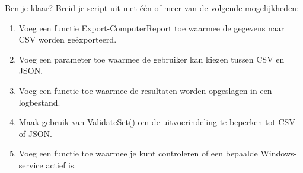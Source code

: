 Ben je klaar? Breid je script uit met één of meer van de volgende mogelijkheden:
\begin{enumerate}
\item Voeg een functie Export-ComputerReport toe waarmee de gegevens naar CSV worden geëxporteerd.
\item Voeg een parameter toe waarmee de gebruiker kan kiezen tussen CSV en JSON.
\item Voeg een functie toe waarmee de resultaten worden opgeslagen in een logbestand.
\item Maak gebruik van ValidateSet() om de uitvoerindeling te beperken tot CSV of JSON.
\item Voeg een functie toe waarmee je kunt controleren of een bepaalde Windows-service actief is.
\end{enumerate}

